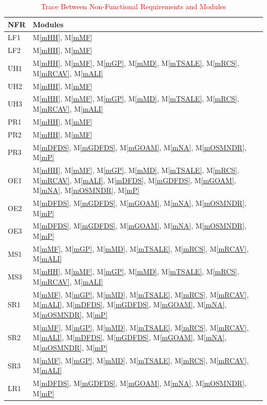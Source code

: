 \documentclass[12pt, titlepage]{article}
\newcommand{\mref}[1]{M\ref{#1}}
\begin{document}
\newpage

\begin{table}[H]
\centering
\begin{tabular}{p{} p{}}
\toprule
\textbf{NFR} & \textbf{Modules}\\
\midrule
LF1 & \mref{mHH}, \mref{mMF}\\
LF2 & \mref{mHH}, \mref{mMF}\\
UH1 & \mref{mHH}, \mref{mMF}, \mref{mGP}, \mref{mMD}, \mref{mTSALE}, \mref{mRCS}, \mref{mRCAV}, \mref{mALI}\\
UH2 & \mref{mHH}, \mref{mMF}\\
UH3 & \mref{mHH}, \mref{mMF}, \mref{mGP}, \mref{mMD}, \mref{mTSALE}, \mref{mRCS}, \mref{mRCAV}, \mref{mALI}\\
PR1 & \mref{mHH}, \mref{mMF}\\
PR2 & \mref{mHH}, \mref{mMF}\\
PR3 & \mref{mDFDS}, \mref{mGDFDS}, \mref{mGOAM}, \mref{mNA}, \mref{mOSMNDR}, \mref{mP}\\
OE1 & \mref{mHH}, \mref{mMF}, \mref{mGP}, \mref{mMD}, \mref{mTSALE}, \mref{mRCS}, \mref{mRCAV}, \mref{mALI}, \mref{mDFDS}, \mref{mGDFDS}, \mref{mGOAM}, \mref{mNA}, \mref{mOSMNDR}, \mref{mP}\\
OE2 & \mref{mDFDS}, \mref{mGDFDS}, \mref{mGOAM}, \mref{mNA}, \mref{mOSMNDR}, \mref{mP}\\
OE3 & \mref{mDFDS}, \mref{mGDFDS}, \mref{mGOAM}, \mref{mNA}, \mref{mOSMNDR}, \mref{mP}\\
MS1 & \mref{mMF}, \mref{mGP}, \mref{mMD}, \mref{mTSALE}, \mref{mRCS}, \mref{mRCAV}, \mref{mALI}\\
MS3 & \mref{mHH}, \mref{mMF}, \mref{mGP}, \mref{mMD},  \mref{mTSALE}, \mref{mRCS}, \mref{mRCAV}, \mref{mALI}\\
SR1 & \mref{mMF}, \mref{mGP}, \mref{mMD},  \mref{mTSALE}, \mref{mRCS}, \mref{mRCAV}, \mref{mALI}, \mref{mDFDS}, \mref{mGDFDS}, \mref{mGOAM}, \mref{mNA}, \mref{mOSMNDR}, \mref{mP}\\
SR2 & \mref{mMF}, \mref{mGP}, \mref{mMD},  \mref{mTSALE}, \mref{mRCS}, \mref{mRCAV}, \mref{mALI}, \mref{mDFDS}, \mref{mGDFDS}, \mref{mGOAM}, \mref{mNA}, \mref{mOSMNDR}, \mref{mP}\\
SR3 & \mref{mMF}, \mref{mGP}, \mref{mMD}, \mref{mTSALE}, \mref{mRCS}, \mref{mRCAV}, \mref{mALI}\\
LR1 & \mref{mDFDS}, \mref{mGDFDS}, \mref{mGOAM}, \mref{mNA}, \mref{mOSMNDR}, \mref{mP}\\

\bottomrule
\end{tabular}
\caption{\textcolor{red}{Trace Between Non-Functional Requirements and Modules}}
\label{TblRT}
\end{table}
\end{document}
